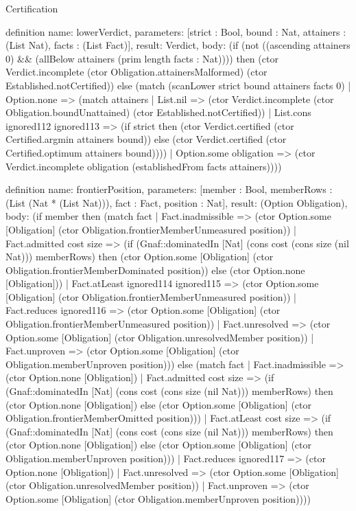 \begin{lexlean}{Certification}
\begin{semanticmodule}
definition{
  name: lowerVerdict,
  parameters: [strict : Bool, bound : Nat, attainers : (List Nat), facts : (List Fact)],
  result: Verdict,
  body: (if (not ((ascending attainers 0) && (allBelow attainers (prim length facts : Nat)))) then (ctor Verdict.incomplete (ctor Obligation.attainersMalformed) (ctor Established.notCertified)) else (match (scanLower strict bound attainers facts 0)
    | Option.none => (match attainers
      | List.nil => (ctor Verdict.incomplete (ctor Obligation.boundUnattained) (ctor Established.notCertified))
      | List.cons ignored112 ignored113 => (if strict then (ctor Verdict.certified (ctor Certified.argmin attainers bound)) else (ctor Verdict.certified (ctor Certified.optimum attainers bound))))
    | Option.some obligation => (ctor Verdict.incomplete obligation (establishedFrom facts attainers))))
}

definition{
  name: frontierPosition,
  parameters: [member : Bool, memberRows : (List (Nat * (List Nat))), fact : Fact, position : Nat],
  result: (Option Obligation),
  body: (if member then (match fact
    | Fact.inadmissible => (ctor Option.some [Obligation] (ctor Obligation.frontierMemberUnmeasured position))
    | Fact.admitted cost size => (if (Gnaf::dominatedIn [Nat] (cons cost (cons size (nil Nat))) memberRows) then (ctor Option.some [Obligation] (ctor Obligation.frontierMemberDominated position)) else (ctor Option.none [Obligation]))
    | Fact.atLeast ignored114 ignored115 => (ctor Option.some [Obligation] (ctor Obligation.frontierMemberUnmeasured position))
    | Fact.reduces ignored116 => (ctor Option.some [Obligation] (ctor Obligation.frontierMemberUnmeasured position))
    | Fact.unresolved => (ctor Option.some [Obligation] (ctor Obligation.unresolvedMember position))
    | Fact.unproven => (ctor Option.some [Obligation] (ctor Obligation.memberUnproven position))) else (match fact
    | Fact.inadmissible => (ctor Option.none [Obligation])
    | Fact.admitted cost size => (if (Gnaf::dominatedIn [Nat] (cons cost (cons size (nil Nat))) memberRows) then (ctor Option.none [Obligation]) else (ctor Option.some [Obligation] (ctor Obligation.frontierMemberOmitted position)))
    | Fact.atLeast cost size => (if (Gnaf::dominatedIn [Nat] (cons cost (cons size (nil Nat))) memberRows) then (ctor Option.none [Obligation]) else (ctor Option.some [Obligation] (ctor Obligation.memberUnproven position)))
    | Fact.reduces ignored117 => (ctor Option.none [Obligation])
    | Fact.unresolved => (ctor Option.some [Obligation] (ctor Obligation.unresolvedMember position))
    | Fact.unproven => (ctor Option.some [Obligation] (ctor Obligation.memberUnproven position))))
}


\end{semanticmodule}
\end{lexlean}

